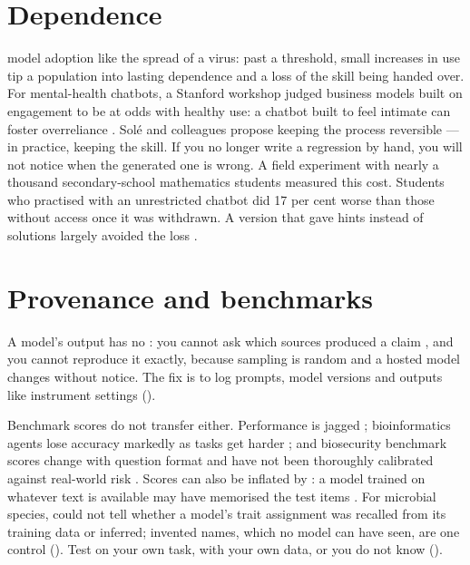 \section{Dependence}

\textcite{sole2026cognitivevirus} model adoption like the spread of a virus:
past a threshold, small increases in use tip a population into lasting
dependence and a loss of the skill being handed over. For mental-health
chatbots, a Stanford workshop judged business models built on engagement to
be at odds with healthy use: a chatbot built to feel intimate can foster
overreliance \parencite{hai2026mentalhealth}. Sol\'e and colleagues propose
keeping the process reversible --- in practice, keeping the skill. If you no longer write a regression by hand, you will not notice
when the generated one is wrong. A field experiment with nearly a thousand
secondary-school mathematics students measured this cost. Students who practised
with an unrestricted chatbot did 17 per cent worse than those without access once
it was withdrawn. A version that gave hints instead of solutions largely avoided
the loss \parencite{bastani2025learning}.

\section{Provenance and benchmarks}

A model's output has no : you cannot ask which sources produced
a claim \parencite{mcshane2024agents}, and you cannot reproduce it exactly, because sampling is random and a
hosted model changes without notice. The fix is to log prompts, model versions
and outputs like instrument settings ().

Benchmark scores do not transfer either. Performance is jagged
\parencite{mitchell2026jagged}; bioinformatics agents lose accuracy markedly as
tasks get harder \parencite{guo2026promptbio}; and biosecurity benchmark scores
change with question format and have not been thoroughly calibrated against
real-world risk \parencite{turner2026biosecuritybenchmarks}. Scores can also
be inflated by : a model trained on whatever
text is available may have memorised the test items
\parencite{magesh2025legalrag}.
For microbial species, \textcite{munch2026phenotypes} could not tell whether a
model's trait assignment was recalled from its training data or inferred;
invented names, which no model can have seen, are one control
(). Test on your own task, with your own data, or you do
not know ().

